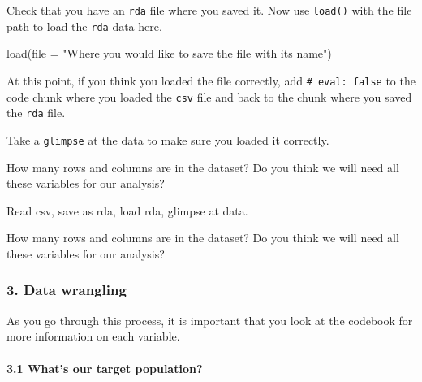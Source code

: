 \documentclass[
  letterpaper,
  DIV=11,
  numbers=noendperiod]{scrartcl}
\let\oldparagraph\paragraph
\renewcommand{\paragraph}[1]{\oldparagraph{#1}\mbox{}}
\newenvironment{Shaded}{\begin{snugshade}}{\end{snugshade}}
\newcommand{\AttributeTok}[1]{\textcolor[rgb]{0.40,0.45,0.13}{#1}}
\newcommand{\FunctionTok}[1]{\textcolor[rgb]{0.28,0.35,0.67}{#1}}
\newcommand{\NormalTok}[1]{\textcolor[rgb]{0.00,0.23,0.31}{#1}}
\newcommand{\StringTok}[1]{\textcolor[rgb]{0.13,0.47,0.30}{#1}}
\begin{document}
Check that you have an \texttt{rda} file where you saved it. Now use
\texttt{load()} with the file path to load the \texttt{rda} data here.

\begin{Shaded}
\begin{Highlighting}[]
\FunctionTok{load}\NormalTok{(}\AttributeTok{file =} \StringTok{"Where you would like to save the file with its name"}\NormalTok{)}
\end{Highlighting}
\end{Shaded}

At this point, if you think you loaded the file correctly, add
\texttt{\#\textbar{}\ eval:\ false} to the code chunk where you loaded
the \texttt{csv} file and back to the chunk where you saved the
\texttt{rda} file.

Take a \texttt{glimpse} at the data to make sure you loaded it
correctly.

How many rows and columns are in the dataset? Do you think we will need
all these variables for our analysis?

\begin{tcolorbox}[enhanced jigsaw, colframe=quarto-callout-important-color-frame, arc=.35mm, colbacktitle=quarto-callout-important-color!10!white, bottomrule=.15mm, left=2mm, breakable, opacitybacktitle=0.6, rightrule=.15mm, opacityback=0, bottomtitle=1mm, coltitle=black, leftrule=.75mm, toptitle=1mm, titlerule=0mm, title=\textcolor{quarto-callout-important-color}{\faExclamation}\hspace{0.5em}{Task Summary}, toprule=.15mm, colback=white]

Read csv, save as rda, load rda, glimpse at data.

How many rows and columns are in the dataset? Do you think we will need
all these variables for our analysis?

\end{tcolorbox}

\hypertarget{data-wrangling}{%
\subsubsection{3. Data wrangling}\label{data-wrangling}}

As you go through this process, it is important that you look at the
codebook for more information on each variable.

\hypertarget{whats-our-target-population}{%
\paragraph{3.1 What's our target
population?}\label{whats-our-target-population}}
\end{document}
